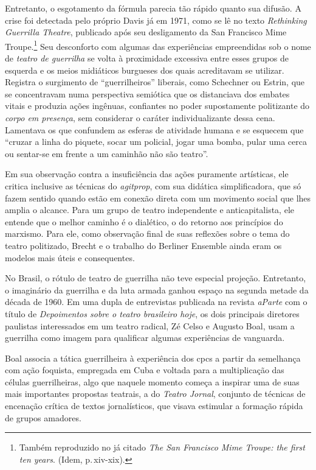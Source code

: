 Entretanto, o esgotamento da fórmula parecia tão rápido quanto sua
difusão. A crise foi detectada pelo próprio Davis já em 1971, como se lê
no texto {\it Rethinking Guerrilla Theatre}, publicado após seu
desligamento da San Francisco Mime Troupe.\footnote{Também reproduzido
  no já citado {\it The San Francisco Mime Troupe: the first ten years}.
  (Idem, p.\,xiv-xix).} Seu desconforto com algumas das experiências
empreendidas sob o nome de {\it teatro de guerrilha} se volta à
proximidade excessiva entre esses grupos de esquerda e os meios
midiáticos burgueses dos quais acreditavam se utilizar. Registra o
surgimento de “guerrilheiros” liberais, como Schechner ou Estrin, que se
concentravam numa perspectiva semiótica que os distanciava dos embates
vitais e produzia ações ingênuas, confiantes no poder supostamente
politizante do {\it corpo em presença}, sem considerar o caráter
individualizante dessa cena. Lamentava os que confundem as esferas de
atividade humana e se esquecem que “cruzar a linha do piquete, socar um
policial, jogar uma bomba, pular uma cerca ou sentar-se em frente a um
caminhão não são teatro”.

Em sua observação contra a insuficiência das ações puramente artísticas,
ele critica inclusive as técnicas do {\it agitprop}, com sua didática
simplificadora, que só fazem sentido quando estão em conexão direta com
um movimento social que lhes amplia o alcance. Para um grupo de teatro
independente e anticapitalista, ele entende que o melhor caminho é o
dialético, o do retorno aos princípios do marxismo. Para ele, como
observação final de suas reflexões sobre o tema do teatro politizado,
Brecht e o trabalho do Berliner Ensemble ainda eram os modelos mais
úteis e consequentes.

\subject{Brasil: A guerrilha no teatro}

No Brasil, o rótulo de teatro de guerrilha não teve especial projeção.
Entretanto, o imaginário da guerrilha e da luta armada ganhou espaço na
segunda metade da década de 1960. Em uma dupla de entrevistas publicada
na revista {\it aParte} com o título de {\it Depoimentos sobre o teatro
brasileiro hoje}, os dois principais diretores paulistas interessados em
um teatro radical, Zé Celso e Augusto Boal, usam a guerrilha como imagem
para qualificar algumas experiências de vanguarda.

Boal associa a tática guerrilheira à experiência dos {\sc cpc}s a partir da
semelhança com ação foquista, empregada em Cuba e voltada para a
multiplicação das células guerrilheiras, algo que naquele momento começa
a inspirar uma de suas mais importantes propostas teatrais, a do
{\it Teatro Jornal}, conjunto de técnicas de encenação crítica de textos
jornalísticos, que visava estimular a formação rápida de grupos
amadores.

